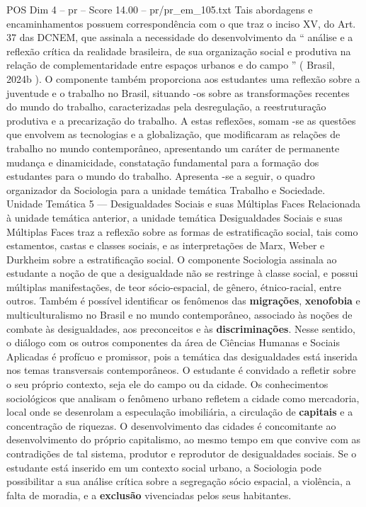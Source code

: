 \begin{textsample}{POS Dim 4 – pr – Score 14.00 – pr/pr\_em\_105.txt}
Tais abordagens e encaminhamentos possuem correspondência com o que traz o inciso XV, do Art. 37 das DCNEM, que assinala a necessidade do desenvolvimento da “ análise e a reflexão crítica da realidade brasileira, de sua organização social e produtiva na relação de complementaridade entre espaços urbanos e do campo ” ( Brasil, 2024b ).
O componente também proporciona aos estudantes uma reflexão sobre a juventude e o trabalho no Brasil, situando -os sobre as transformações recentes do mundo do trabalho, caracterizadas pela desregulação, a reestruturação produtiva e a precarização do trabalho.
A estas reflexões, somam -se as questões que envolvem as tecnologias e a globalização, que modificaram as relações de trabalho no mundo contemporâneo, apresentando um caráter de permanente mudança e dinamicidade, constatação fundamental para a formação dos estudantes para o mundo do trabalho.
Apresenta -se a seguir, o quadro organizador da Sociologia para a unidade temática Trabalho e Sociedade.
Unidade Temática 5 — Desigualdades Sociais e suas Múltiplas Faces Relacionada à unidade temática anterior, a unidade temática Desigualdades Sociais e suas Múltiplas Faces traz a reflexão sobre as formas de estratificação social, tais como estamentos, castas e classes sociais, e as interpretações de Marx, Weber e Durkheim sobre a estratificação social.
O componente Sociologia assinala ao estudante a noção de que a desigualdade não se restringe à classe social, e possui múltiplas manifestações, de teor sócio-espacial, de gênero, étnico-racial, entre outros.
Também é possível identificar os fenômenos das \textbf{migrações}, \textbf{xenofobia} e multiculturalismo no Brasil e no mundo contemporâneo, associado às noções de combate às desigualdades, aos preconceitos e às \textbf{discriminações}.
Nesse sentido, o diálogo com os outros componentes da área de Ciências Humanas e Sociais Aplicadas é profícuo e promissor, pois a temática das desigualdades está inserida nos temas transversais contemporâneos.
O estudante é convidado a refletir sobre o seu próprio contexto, seja ele do campo ou da cidade.
Os conhecimentos sociológicos que analisam o fenômeno urbano refletem a cidade como mercadoria, local onde se desenrolam a especulação imobiliária, a circulação de \textbf{capitais} e a concentração de riquezas.
O desenvolvimento das cidades é concomitante ao desenvolvimento do próprio capitalismo, ao mesmo tempo em que convive com as contradições de tal sistema, produtor e reprodutor de desigualdades sociais.
Se o estudante está inserido em um contexto social urbano, a Sociologia pode possibilitar a sua análise crítica sobre a segregação sócio espacial, a violência, a falta de moradia, e a \textbf{exclusão} vivenciadas pelos seus habitantes.

\end{textsample}

